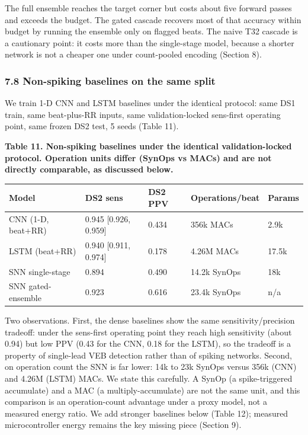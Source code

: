 \documentclass[
]{article}
\begin{document}
The full ensemble reaches the target corner but costs about five forward
passes and exceeds the budget. The gated cascade recovers most of that
accuracy within budget by running the ensemble only on flagged beats.
The naive T32 cascade is a cautionary point: it costs more than the
single-stage model, because a shorter network is not a cheaper one under
count-pooled encoding (Section 8).

\subsubsection{7.8 Non-spiking baselines on the same
split}\label{non-spiking-baselines-on-the-same-split}

We train 1-D CNN and LSTM baselines under the identical protocol: same
DS1 train, same beat-plus-RR inputs, same validation-locked sens-first
operating point, same frozen DS2 test, 5 seeds (Table 11).

\textbf{Table 11. Non-spiking baselines under the identical
validation-locked protocol. Operation units differ (SynOps vs MACs) and
are not directly comparable, as discussed below.}

\begin{longtable}[]{@{}lllll@{}}
\toprule\noalign{}
Model & DS2 sens & DS2 PPV & Operations/beat & Params \\
\midrule\noalign{}
\endhead
\bottomrule\noalign{}
\endlastfoot
CNN (1-D, beat+RR) & 0.945 {[}0.926, 0.959{]} & 0.434 & 356k MACs &
2.9k \\
LSTM (beat+RR) & 0.940 {[}0.911, 0.974{]} & 0.178 & 4.26M MACs &
17.5k \\
SNN single-stage & 0.894 & 0.490 & 14.2k SynOps & 18k \\
SNN gated-ensemble & 0.923 & 0.616 & 23.4k SynOps & n/a \\
\end{longtable}

Two observations. First, the dense baselines show the same
sensitivity/precision tradeoff: under the sens-first operating point
they reach high sensitivity (about 0.94) but low PPV (0.43 for the CNN,
0.18 for the LSTM), so the tradeoff is a property of single-lead VEB
detection rather than of spiking networks. Second, on operation count
the SNN is far lower: 14k to 23k SynOps versus 356k (CNN) and 4.26M
(LSTM) MACs. We state this carefully. A SynOp (a spike-triggered
accumulate) and a MAC (a multiply-accumulate) are not the same unit, and
this comparison is an operation-count advantage under a proxy model, not
a measured energy ratio. We add stronger baselines below (Table 12);
measured microcontroller energy remains the key missing piece (Section
9).
\end{document}
